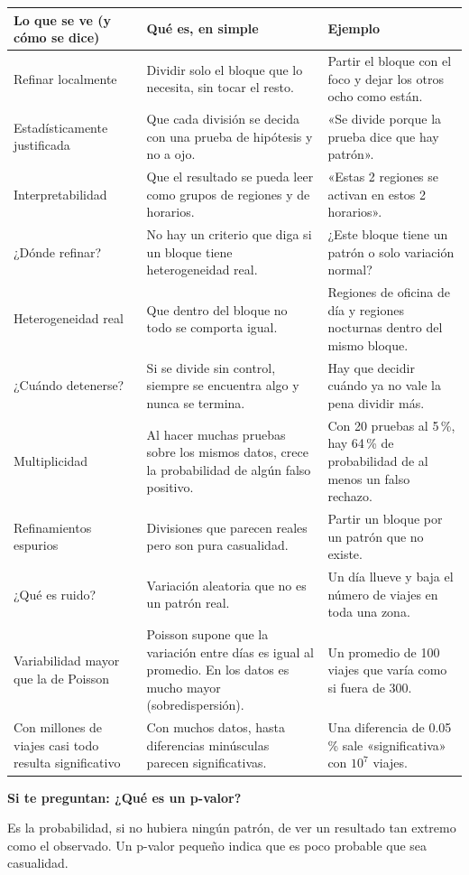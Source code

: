 \documentclass[11pt,a4paper]{article}
\makeatletter
\newcommand{\cajainicio}[3]{\def\cajafc{#1}\def\cajabc{#2}\par\medskip\noindent
  \begin{lrbox}{\cajabox}\begin{minipage}{\dimexpr\linewidth-2\fboxsep-2\fboxrule\relax}%
  \small\textbf{\color{#1}#3}\par\smallskip}
\newcommand{\cajafin}{\end{minipage}\end{lrbox}\fcolorbox{\cajafc}{\cajabc}{\usebox{\cajabox}}\par\medskip}
\newenvironment{preg}[1]{\cajainicio{acc}{acc!7}{Si te preguntan: #1}}{\cajafin}
\newenvironment{partes}{%
  \begin{longtable}{@{}>{\raggedright\arraybackslash}p{4.3cm}>{\raggedright\arraybackslash}p{6.0cm}>{\raggedright\arraybackslash}p{5.0cm}@{}}
  \toprule \textbf{Lo que se ve (y cómo se dice)} & \textbf{Qué es, en simple} & \textbf{Ejemplo}\\ \midrule \endhead}{%
  \bottomrule\end{longtable}}
\newcommand{\se}[1]{\newline{\small\color{ucspblue}(se dice «#1»)}}
\makeatother
\begin{document}
\begin{partes}
Refinar localmente & Dividir solo el bloque que lo necesita, sin tocar el resto. & Partir el bloque con el foco y dejar los otros ocho como están. \\
Estadísticamente justificada & Que cada división se decida con una prueba de hipótesis y no a ojo. & «Se divide porque la prueba dice que hay patrón». \\
Interpretabilidad & Que el resultado se pueda leer como grupos de regiones y de horarios. & «Estas 2 regiones se activan en estos 2 horarios». \\
¿Dónde refinar? & No hay un criterio que diga si un bloque tiene heterogeneidad real. & ¿Este bloque tiene un patrón o solo variación normal? \\
Heterogeneidad real & Que dentro del bloque no todo se comporta igual. & Regiones de oficina de día y regiones nocturnas dentro del mismo bloque. \\
¿Cuándo detenerse? & Si se divide sin control, siempre se encuentra algo y nunca se termina. & Hay que decidir cuándo ya no vale la pena dividir más. \\
Multiplicidad & Al hacer muchas pruebas sobre los mismos datos, crece la probabilidad de algún falso positivo. & Con 20 pruebas al 5\,\%, hay 64\,\% de probabilidad de al menos un falso rechazo. \\
Refinamientos espurios & Divisiones que parecen reales pero son pura casualidad. & Partir un bloque por un patrón que no existe. \\
¿Qué es ruido? & Variación aleatoria que no es un patrón real. & Un día llueve y baja el número de viajes en toda una zona. \\
Variabilidad mayor que la de Poisson \se{poasón} & Poisson supone que la variación entre días es igual al promedio. En los datos es mucho mayor (sobredispersión). & Un promedio de 100 viajes que varía como si fuera de 300. \\
Con millones de viajes casi todo resulta significativo & Con muchos datos, hasta diferencias minúsculas parecen significativas. & Una diferencia de 0.05\,\% sale «significativa» con $10^7$ viajes. \\
\end{partes}

\begin{preg}{¿Qué es un p-valor?}
Es la probabilidad, si no hubiera ningún patrón, de ver un resultado tan extremo como el observado. Un p-valor pequeño indica que es poco probable que sea casualidad.
\end{preg}
\end{document}
